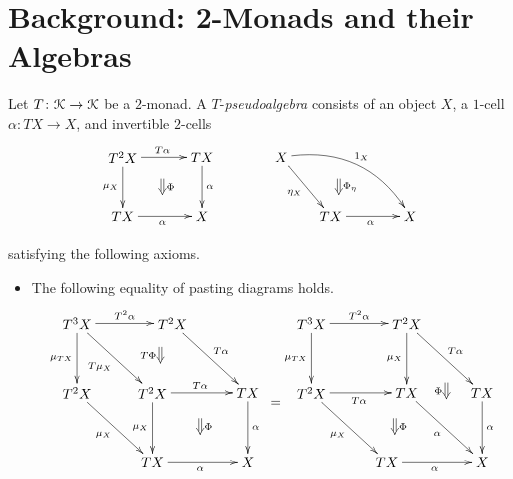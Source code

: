 
\section{Background: 2-Monads and their Algebras}

\begin{Defi}
Let $T \colon \mathcal{K} \rightarrow \mathcal{K}$ be a $2$-monad. A $T$-\textit{pseudoalgebra} consists of an object $X$, a $1$-cell $\alpha \colon TX \rightarrow X$, and invertible $2$-cells
    \[
        \xy
            (0,0)*+{T^2X}="00";
            (20,0)*+{TX}="10";
            (0,-15)*+{TX}="01";
            (20,-15)*+{X}="11";
            {\ar^{T\alpha} "00" ; "10"};
            {\ar^{\alpha} "10" ; "11"};
            {\ar_{\mu_X} "00" ;  "01"};
            {\ar_{\alpha} "01" ; "11"};
            {\ar@{=>}^{\Phi} (10,-5.5) ; (10,-9.5)};
            (40,0)*+{X}="20";
            (52.5,-15)*+{TX}="31";
            (72.5,-15)*+{X}="41";
            {\ar_{\eta_X} "20" ; "31"};
            {\ar_{\alpha} "31" ; "41"};
            {\ar@/^1.5pc/^{1_X} "20" ; "41"};
            {\ar@{=>}^{\Phi_{\eta}} (54.5,-5.5) ; (54.5,-9.5)};
        \endxy
    \]

satisfying the following axioms.
    \begin{itemize}
        \item The following equality of pasting diagrams holds.
    \[
        \xy
            (5,0)*+{T^3X}="t3xl";
            (29,0)*+{T^2X}="t2xl1";
            (5,-17.5)*+{T^2X}="t2xl2";
            (24,-35)*+{TX}="txl1";
            (48,-17.5)*+{TX}="txl2";
            (48,-35)*+{X}="xl";
            (24,-17.5)*+{T^2X}="t2xl3";
            {\ar^{T^2\alpha} "t3xl" ; "t2xl1"};
            {\ar^{T\alpha} "t2xl1" ; "txl2"};
            {\ar^{\alpha} "txl2" ; "xl"};
            {\ar_{\mu_{TX}} "t3xl" ; "t2xl2"};
            {\ar_{\mu_X} "t2xl2" ; "txl1"};
            {\ar_{\alpha} "txl1" ; "xl"};
            {\ar_{T\mu_X} "t3xl" ; "t2xl3"};
            {\ar^{T\alpha} "t2xl3" ; "txl2"};
            {\ar_{\mu_X} "t2xl3" ; "txl1"};
            {\ar@{=>}_{T\Phi} (26,-6) ; (26,-10)};
            {\ar@{=>}^{\Phi} (36,-24) ; (36,-28)};
            (64,0)*+{T^3X}="t3xr";
            (88,0)*+{T^2X}="t2xr1";
            (64,-17.5)*+{T^2X}="t2xr2";
            (83,-35)*+{TX}="txr1";
            (107,-17.5)*+{TX}="txr2";
            (107,-35)*+{X}="xr";
            (88,-17.5)*+{TX}="txr3";
            {\ar^{T^2\alpha} "t3xr" ; "t2xr1"};
            {\ar^{T\alpha} "t2xr1" ; "txr2"};
            {\ar^{\alpha} "txr2" ; "xr"};
            {\ar_{\mu_{TX}} "t3xr" ; "t2xr2"};
            {\ar_{\mu_X} "t2xr2" ; "txr1"};
            {\ar_{\alpha} "txr1" ; "xr"};
            {\ar_{T\alpha} "t2xr2" ; "txr3"};
            {\ar_{\alpha} "txr3" ; "xr"};
            {\ar_{\mu_X} "t2xr1" ; "txr3"};
            {\ar@{=>}_{\Phi} (98,-15) ; (98,-19)};
            {\ar@{=>}^{\Phi} (85,-24) ; (85,-28)};
            {\ar@{=} (54,-20) ; (56,-20)};
        \endxy
    \]


\end{itemize}
\end{Defi}
